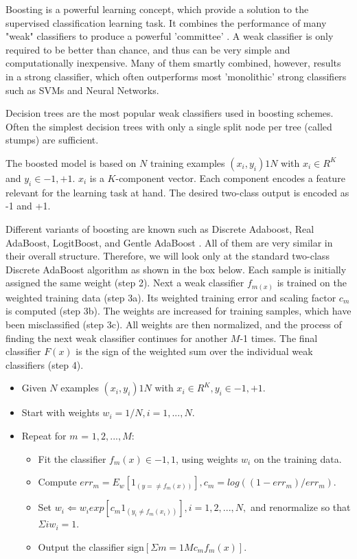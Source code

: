 Boosting is a powerful learning concept, which provide a solution to the supervised classification learning task. It combines the performance of many "weak" classifiers to produce a powerful 'committee' . A weak classifier is only required to be better than chance, and thus can be very simple and computationally inexpensive. Many of them smartly combined, however, results in a strong classifier, which often outperforms most 'monolithic' strong classifiers such as SVMs and Neural Networks.

Decision trees are the most popular weak classifiers used in boosting schemes. Often the simplest decision trees with only a single split node per tree (called stumps) are sufficient.

The boosted model is based on $N$ training examples ${(x_i,y_i)}1N$ with $x_i \in{R^K}$ and $y_i \in{-1, +1}$. $x_i$ is a $K$-component vector. Each component encodes a feature relevant for the learning task at hand. The desired two-class output is encoded as -1 and +1.

Different variants of boosting are known such as Discrete Adaboost, Real AdaBoost, LogitBoost, and Gentle AdaBoost . All of them are very similar in their overall structure. Therefore, we will look only at the standard two-class Discrete AdaBoost algorithm as shown in the box below. Each sample is initially assigned the same weight (step 2). Next a weak classifier $f_{m(x)}$ is trained on the weighted training data (step 3a). Its weighted training error and scaling factor $c_m$ is computed (step 3b). The weights are increased for training samples, which have been misclassified (step 3c). All weights are then normalized, and the process of finding the next weak classifier continues for another $M$-1 times. The final classifier $F(x)$ is the sign of the weighted sum over the individual weak classifiers (step 4).

\begin{itemize}
\item Given $N$ examples ${(x_i,y_i)}1N$ with $x_i \in{R^K}, y_i \in{-1, +1}$.
\item Start with weights $w_i = 1/N, i = 1,...,N$.
\item Repeat for $m$ = $1,2,...,M$:
\begin{itemize}
\item Fit the classifier $f_m(x) \in{-1,1}$, using weights $w_i$ on the training data.
\item Compute $err_m = E_w [1_{(y =\neq f_m(x))}], c_m = log((1 - err_m)/err_m)$.
\item Set $w_i \Leftarrow w_i exp[c_m 1_{(y_i \neq f_m(x_i))}], i = 1,2,...,N,$ and renormalize so that $\Sigma i w_i = 1$.
\item Output the classifier sign$[\Sigma m = 1M c_m f_m(x)]$.
\end{itemize}
\end{itemize}

